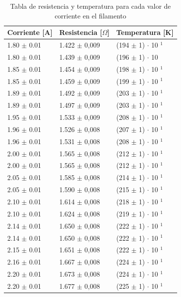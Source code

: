 \documentclass[%
 reprint,
 amsmath,amssymb,
 aps,
]{revtex4-2}
\begin{document}
\begin{table}[H]
    \centering
    \begin{tabular}{l|l|l}
        \toprule
        \toprule
        Corriente [A] & Resistencia [$\Omega$] & Temperatura [K]\\
        \midrule
        1.80 $\pm$ 0.01 &  1.422 $\pm$ 0,009  &  (194 $\pm$ 1)  $\cdot$ 10 $^{1}$\\
        1.80 $\pm$ 0.01  &  1.439 $\pm$ 0,009  &  (196 $\pm$ 1)  $\cdot$ 10\\
        1.85 $\pm$ 0.01  &  1.454 $\pm$ 0,009  &  (198 $\pm$ 1)  $\cdot$ 10 $^{1}$\\
        1.85 $\pm$ 0.01  &  1.459 $\pm$ 0,009  &  (199 $\pm$ 1)  $\cdot$ 10 $^{1}$\\
        1.89 $\pm$ 0.01  &  1.492 $\pm$ 0,009  &  (203 $\pm$ 1)  $\cdot$ 10 $^{1}$\\
        1.89 $\pm$ 0.01  &  1.497 $\pm$ 0,009  &  (203 $\pm$ 1)  $\cdot$ 10 $^{1}$\\
        1.95 $\pm$ 0.01  &  1.533 $\pm$ 0,009  &  (208 $\pm$ 1)  $\cdot$ 10 $^{1}$\\
        1.96 $\pm$ 0.01  &  1.526 $\pm$ 0,008  &  (207 $\pm$ 1)  $\cdot$ 10 $^{1}$\\
        1.96 $\pm$ 0.01  &  1.531 $\pm$ 0,008  &  (208 $\pm$ 1)  $\cdot$ 10 $^{1}$\\
        2.00 $\pm$ 0.01  &  1.565 $\pm$ 0,008  &  (212 $\pm$ 1)  $\cdot$ 10 $^{1}$\\
        2.00 $\pm$ 0.01  &  1.565 $\pm$ 0,008  &  (212 $\pm$ 1)  $\cdot$ 10 $^{1}$\\
        2.05 $\pm$ 0.01  &  1.585 $\pm$ 0,008  &  (214 $\pm$ 1)  $\cdot$ 10 $^{1}$\\
        2.05 $\pm$ 0.01  &  1.590 $\pm$ 0,008  &  (215 $\pm$ 1)  $\cdot$ 10 $^{1}$\\
        2.10 $\pm$ 0.01  &  1.614 $\pm$ 0,008  &  (218 $\pm$ 1)  $\cdot$ 10 $^{1}$\\
        2.10 $\pm$ 0.01  &  1.624 $\pm$ 0,008  &  (219 $\pm$ 1)  $\cdot$ 10 $^{1}$\\
        2.14 $\pm$ 0.01  &  1.650 $\pm$ 0,008  &  (222 $\pm$ 1)  $\cdot$ 10 $^{1}$\\
        2.14 $\pm$ 0.01  &  1.650 $\pm$ 0,008  &  (222 $\pm$ 1)  $\cdot$ 10 $^{1}$\\
        2.15 $\pm$ 0.01  &  1.651 $\pm$ 0,008  &  (222 $\pm$ 1)  $\cdot$ 10 $^{1}$\\
        2.16 $\pm$ 0.01  &  1.667 $\pm$ 0,008  &  (224 $\pm$ 1)  $\cdot$ 10 $^{1}$\\
        2.20 $\pm$ 0.01  &  1.673 $\pm$ 0,008  &  (224 $\pm$ 1)  $\cdot$ 10 $^{1}$\\
        2.20 $\pm$ 0.01  &  1.677 $\pm$ 0,008  &  (225 $\pm$ 1)  $\cdot$ 10 $^{1}$\\
        \bottomrule
        \bottomrule
    \end{tabular}
    \caption{Tabla de resistencia y temperatura para cada valor de corriente en el filamento}
    \label{tab: Resistencias filamento}
\end{table}
\end{document}
